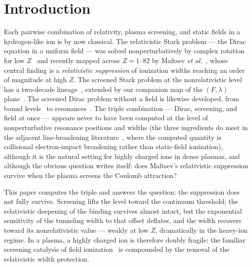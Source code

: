 \documentclass[aps,pra,twocolumn,superscriptaddress,floatfix,longbibliography]{revtex4-2}
\begin{document}
\maketitle

\section{Introduction}

Each pairwise combination of relativity, plasma screening, and static
fields in a hydrogen-like ion is by now classical. The relativistic
Stark problem --- the Dirac equation in a uniform field --- was
solved nonperturbatively by complex rotation for low
$Z$~\cite{IvanovHo2004} and recently mapped across $Z=1$--$82$ by
Maltsev \emph{et al.}~\cite{Maltsev2023}, whose central finding is a
\emph{relativistic suppression} of ionization widths reaching an
order of magnitude at high $Z$. The screened Stark problem at the
nonrelativistic level has a two-decade
lineage~\cite{YuHo2005,LinHo2011,BaharSoylu2014}, extended by our
companion map of the $(F,\lambda)$ plane~\cite{companionD}. The screened Dirac
problem without a field is likewise developed, from bound
levels~\cite{BielinskaWaz2004} to resonances~\cite{Shi2014,
companionB}. The triple combination --- Dirac, screening, and field
at once --- appears never to have been computed at the level of
nonperturbative resonance positions and widths (the three
ingredients do meet in the adjacent line-broadening
literature~\cite{Zenkhri2023,Wu2026}, where the computed quantity is
collisional electron-impact broadening rather than static-field
ionization), although it is the
natural setting for highly charged ions in dense plasmas, and
although the obvious question writes itself: does Maltsev's
relativistic suppression survive when the plasma screens the
Coulomb attraction?

This paper computes the triple and answers the question: the
suppression does not fully survive. Screening lifts the level toward
the continuum threshold; the relativistic deepening of the binding
survives almost intact, but the exponential sensitivity of the
tunneling width to that offset deflates, and the width recovers
toward its nonrelativistic value --- weakly at low $Z$, dramatically
in the heavy-ion regime. In a plasma, a highly charged ion is therefore
doubly fragile: the familiar screening catalysis of field
ionization~\cite{YuHo2005,companionD} is compounded by the removal
of the relativistic width protection.
\end{document}

